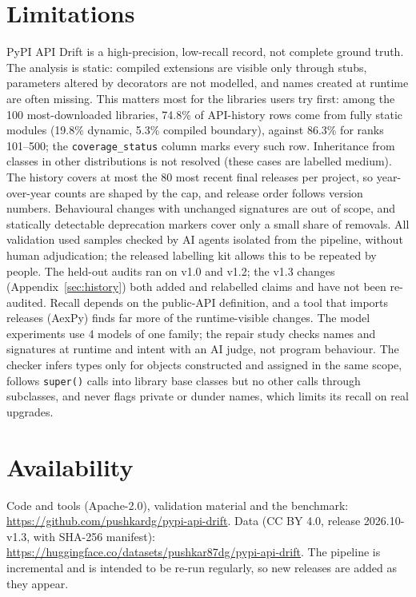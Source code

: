 \documentclass[10pt,twocolumn,letterpaper]{article}
\begin{document}
\section{Limitations}
PyPI API Drift is a high-precision, low-recall record, not complete ground truth. The analysis is static: compiled
extensions are visible only through stubs, parameters altered by decorators are not modelled, and names created at
runtime are often missing. This matters most for the libraries users try first: among the 100 most-downloaded
libraries, 74.8\% of API-history rows come from fully static modules (19.8\% dynamic,
5.3\% compiled boundary), against 86.3\% for ranks 101--500; the
\texttt{coverage\_status} column marks every such row. Inheritance from classes in other distributions is not
resolved (these cases are labelled medium). The history covers at most the 80 most recent final releases per
project, so year-over-year counts are shaped by the cap, and release order follows version numbers. Behavioural
changes with unchanged signatures are out of scope, and statically detectable deprecation markers cover only a small
share of removals. All validation used samples checked by AI agents isolated from the pipeline, without human
adjudication; the released labelling kit allows this to be repeated by people. The held-out audits ran on v1.0 and v1.2; the v1.3
changes (Appendix~\ref{sec:history}) both added and relabelled claims and have not been re-audited. Recall depends on
the public-API definition, and a tool that imports releases (AexPy) finds far more of the runtime-visible changes.
The model experiments use 4 models of one family; the repair study checks names and signatures at
runtime and intent with an AI judge, not program behaviour. The checker infers types only for objects constructed and
assigned in the same scope, follows \texttt{super()} calls into library base classes but no other calls through
subclasses, and never flags private or dunder names, which limits its recall on real upgrades.

\section{Availability}
Code and tools (Apache-2.0), validation material and the benchmark:
\url{https://github.com/pushkardg/pypi-api-drift}. Data (CC BY 4.0, release 2026.10-v1.3, with SHA-256 manifest):
\url{https://huggingface.co/datasets/pushkar87dg/pypi-api-drift}. The pipeline is incremental and is intended to be
re-run regularly, so new releases are added as they appear.
\end{document}
